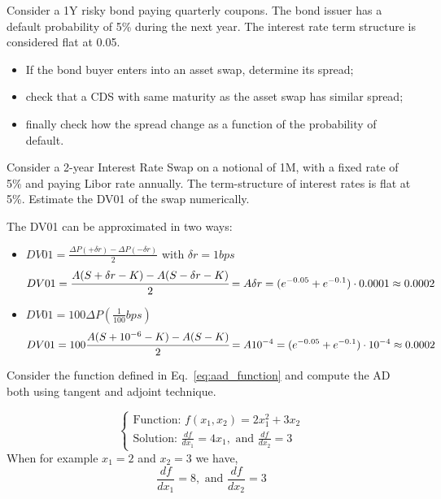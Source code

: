 \documentclass[12pt,a4paper]{book}
\begin{document}
\begin{exercise}[subtitle=Asset Swap vs CDS (\texttt{python})]
Consider a 1Y risky bond paying quarterly coupons. The bond issuer has a default probability of 5\% during the next year. The interest rate term structure is considered flat at 0.05.

\begin{itemize}
\item If the bond buyer enters into an asset swap, determine its spread;
\item check that a CDS with same maturity as the asset swap has similar spread;
\item finally check how the spread change as a function of the probability of default.
\end{itemize}
\end{exercise}

\begin{exercise}[subtitle=DV01]
Consider a 2-year Interest Rate Swap on a notional of 1M, with a fixed rate of 5\% and paying Libor rate annually. The term-structure of interest rates is flat at 5\%.
Estimate the DV01 of the swap numerically.  
\end{exercise}
\begin{solution}
The DV01 can be approximated in two ways:
\begin{itemize}
\item $DV01 = \frac{\Delta P(+\delta r)-\Delta P(-\delta r)}{2}$ with $\delta r = 1 bps$
\begin{equation*}
DV01 = \cfrac{A(S+\delta r-K) - A(S-\delta r-K)}{2} = A\delta r = (e^{-0.05}+e^{-0.1})\cdot 0.0001 \approx 0.0002
\end{equation*}
\item $DV01 = 100\Delta P(\frac{1}{100}bps)$
\begin{equation*}
DV01 = 100\cfrac{A(S+ 10^{-6}-K) - A(S-K)}{2} = A 10^{-4} = (e^{-0.05}+e^{-0.1})\cdot10^{-4} \approx 0.0002
\end{equation*}
\end{itemize}
\end{solution}

\begin{exercise}[subtitle=AD for a Simple Function (\texttt{python})]
Consider the function defined in Eq.~\ref{eq:aad_function} and compute the AD both using tangent and adjoint technique.
\end{exercise}

\begin{solution}
\begin{equation}
\begin{cases}
\text{Function: } f(x_1, x_2) = 2x_1^2 + 3x_2\\
\text{Solution: } \frac{df}{dx_1} = 4x_1, \text{ and } \frac{df}{dx_2}=3
\end{cases}
\end{equation}
When for example $x_1=2$ and $x_2 = 3$ we have,
\begin{equation}
\frac{df}{dx_1} = 8, \text{ and } \frac{df}{dx_2}=3
\end{equation}
\end{solution}
\end{document}

